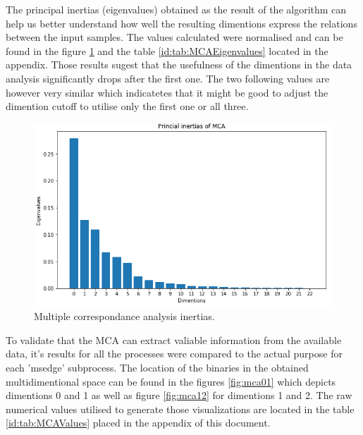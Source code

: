 \documentclass[a4paper,twoside,12pt]{book}
\begin{document}
The principal inertias (eigenvalues) obtained as the result of the algorithm can help us better 
understand how well the resulting dimentions express the relations between the input samples. 
The values calculated were normalised and can be found in the figure \ref{fig:mcaInertias} and 
the table \ref{id:tab:MCAEigenvalues} located in the appendix. Those results sugest that the 
usefulness of the dimentions in the data analysis significantly drops after the first one. The two
following values are however very similar which indicatetes that it might be good to adjust the 
dimention cutoff to utilise only the first one or all three.


\begin{figure}
	\centering
	\includegraphics[scale=0.9]{images/MCAEigenvalues}
	\caption{Multiple correspondance analysis inertias.}
	\label{fig:mcaInertias}
 \end{figure}

To validate that the MCA can extract valiable information from the available data, it's results for all
the processes were compared to the actual purpose for each 'msedge' subprocess. The location of the
binaries in the obtained multidimentional space can be found in the figures \ref{fig:mca01} which 
depicts dimentions 0 and 1 as well as figure \ref{fig:mca12} for dimentions 1 and 2. The raw numerical 
values utilised to generate those visualizations are located in the table \ref{id:tab:MCAValues} placed 
in the appendix of this document. 
\end{document}
